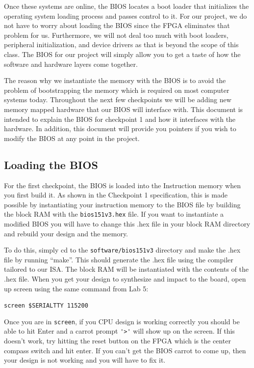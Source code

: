 \documentclass[11pt]{article}
\begin{document}
Once these systems are online, the BIOS locates a boot loader that initializes the operating
system loading process and passes control to it. For our project, we do not have to worry about
loading the BIOS since the FPGA eliminates that problem for us. Furthermore, we will not deal
too much with boot loaders, peripheral initialization, and device drivers as that is beyond the
scope of this class. The BIOS for our project will simply allow you to get a taste of how the
software and hardware layers come together.

The reason why we instantiate the memory with the BIOS is to avoid the problem of
bootstrapping the memory which is required on most computer systems today. Throughout the
next few checkpoints we will be adding new memory mapped hardware that our BIOS will
interface with. This document is intended to explain the BIOS for checkpoint 1 and how it
interfaces with the hardware. In addition, this document will provide you pointers if you wish to
modify the BIOS at any point in the project.

\subsection{Loading the BIOS}
For the first checkpoint, the BIOS is loaded into the Instruction memory when you first build it.
As shown in the Checkpoint 1 specification, this is made possible by instantiating your
instruction memory to the BIOS file by building the block RAM with the \verb|bios151v3.hex| file. If you
want to instantiate a modified BIOS you will have to change this .hex file in your block RAM
directory and rebuild your design and the memory.

To do this, simply cd to the \verb|software/bios151v3| directory and make the .hex file by running
“make”. This should generate the .hex file using the compiler tailored to our ISA. The
block RAM will be instantiated with the contents of the .hex file.
When you get your design to synthesize and impact to the board, open up screen using the
same command from Lab 5:

\verb|screen $SERIALTTY 115200|

Once you are in \verb|screen|, if you CPU design is working correctly you should be able to hit Enter
and a carrot prompt \verb|'>'| will show up on the screen. If this doesn’t work, try hitting the reset
button on the FPGA which is the center compass switch and hit enter. If you can’t get the BIOS
carrot to come up, then your design is not working and you will have to fix it.
\end{document}
